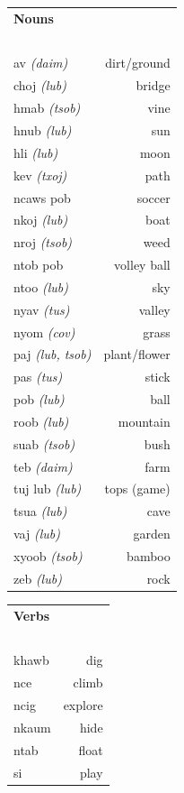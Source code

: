 \documentclass{article}
\begin{document}
\clearpage

\begin{multicols}{2}
[
\section*{}
]

\begin{tabular}{l r}
\textbf{Nouns} \\
~\\
av {\em (daim)} &dirt/ground\\
choj {\em (lub)} &bridge\\
hmab {\em (tsob)} &vine\\
hnub {\em (lub)} &sun\\
hli {\em (lub)} &moon\\
kev {\em (txoj)} &path\\
ncaws pob &soccer\\
nkoj {\em (lub)} &boat\\
nroj {\em (tsob)} &weed\\
ntob pob &volley ball\\
ntoo {\em (lub)} &sky\\
nyav {\em (tus)} &valley\\
nyom {\em (cov)} &grass\\
paj {\em (lub, tsob)} &plant/flower\\
pas {\em (tus)} &stick\\
pob {\em (lub)} &ball\\
roob {\em (lub)} &mountain\\
suab {\em (tsob)} &bush\\
teb {\em (daim)} &farm\\
tuj lub {\em (lub)} &tops (game)\\
tsua {\em (lub)} &cave\\
vaj {\em (lub)} &garden\\
xyoob {\em (tsob)} &bamboo\\
zeb {\em (lub)} &rock\\
\end{tabular}

\begin{tabular}{l r}
\textbf{Verbs} \\
~\\
khawb &dig\\
nce &climb\\
ncig &explore\\
nkaum &hide\\
ntab &float\\
si &play\\

\end{tabular}
\end{multicols}
\end{document}
